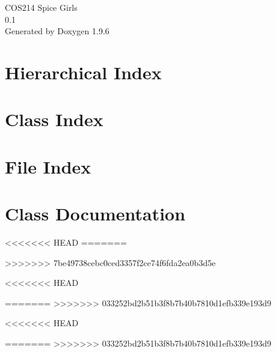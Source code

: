 \documentclass[twoside]{book}
\newcommand{\+}{\discretionary{\mbox{\scriptsize$\hookleftarrow$}}{}{}}
\newcommand{\clearemptydoublepage}{%
    \newpage{\pagestyle{empty}\cleardoublepage}%
  }
\begin{document}
  \raggedbottom
    \hypersetup{pageanchor=false,
                bookmarksnumbered=true,
                pdfencoding=unicode
               }
  \begin{titlepage}
  \vspace*{7cm}
  \begin{center}%
  {\Large COS214 Spice Girls}\\
  [1ex]\large 0.\+1 \\
  \vspace*{1cm}
  {\large Generated by Doxygen 1.9.6}\\
  \end{center}
  \end{titlepage}
  \clearemptydoublepage
  \tableofcontents
  \clearemptydoublepage
  \hypersetup{pageanchor=true}
\chapter{Hierarchical Index}

\chapter{Class Index}

\chapter{File Index}

\chapter{Class Documentation}





<<<<<<< HEAD
=======


>>>>>>> 7be49738cebc0ced3357f2ce74f6fda2ea0b3d5e


<<<<<<< HEAD

=======
>>>>>>> 033252bd2b51b3f8b7b40b7810d1efb339e193d9





<<<<<<< HEAD


=======
>>>>>>> 033252bd2b51b3f8b7b40b7810d1efb339e193d9













\end{document}
